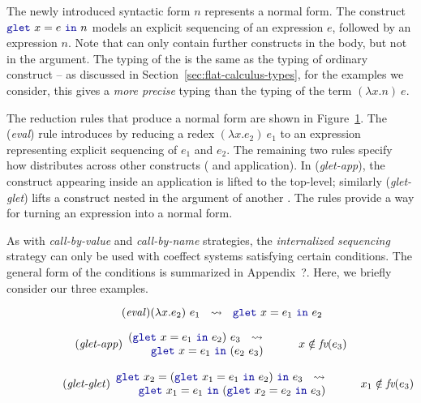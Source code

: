 The newly introduced syntactic form $n$ represents a normal form. The construct $\kvd{glet}~x=e~\kvd{in}~n$
models an explicit sequencing of an expression $e$, followed by an expression $n$. Note that  can 
only contain further  constructs in the body, but not in the argument. The typing of the 
is the same as the typing of ordinary  construct -- as discussed in Section~\ref{sec:flat-calculus-types},
for the examples we consider, this gives a \emph{more precise} typing than the typing of the
term $(\lambda x.n)~e$.

The reduction rules that produce a normal form are shown in Figure~\ref{fig:flat-normal-form}. The
(\emph{eval}) rule introduces  by reducing a redex $(\lambda x.e_2)~e_1$ to an expression
representing explicit sequencing of $e_1$ and $e_2$. The remaining two rules specify how 
distributes across other constructs ( and application). In (\emph{glet-app}), the 
construct appearing inside an application is lifted to the top-level; similarly (\emph{glet-glet}) 
lifts a  construct nested in the argument of another . The rules provide a way
for turning an expression into a normal form.

As with \emph{call-by-value} and \emph{call-by-name} strategies, the \emph{internalized sequencing}
strategy can only be used with coeffect systems satisfying certain conditions. The general form of
the conditions is summarized in Appendix~?. Here, we briefly consider our three examples.


\begin{figure}[t]

\begin{equation*}
\tag{\emph{eval}}
(\lambda x.e_2)~e_1 ~~\leadsto~~ \kvd{glet}~x=e_1~\kvd{in}~e_2
\end{equation*}

\begin{equation*}
\tag{\emph{glet-app}}
\begin{array}{l}
  (\kvd{glet}~x=e_1~\kvd{in}~e_2)~e_3  ~~\leadsto~~\\ \qquad \kvd{glet}~x=e_1~\kvd{in}~(e_2~e_3)
\end{array}
\qquad x \notin \textit{fv}(e_3)\qquad
\end{equation*}

\begin{equation*}
\tag{\emph{glet-glet}}
\begin{array}{l}
  \kvd{glet}~x_2=(\kvd{glet}~x_1 = e_1~\kvd{in}~e_2)~\kvd{in}~e_3  ~~\leadsto~~\\
  \qquad \kvd{glet}~x_1=e_1~\kvd{in}~(\kvd{glet}~x_2=e_2~\kvd{in}~e_3)
\end{array}
\qquad x_1 \notin \textit{fv}(e_3)\qquad
\end{equation*}

\label{fig:flat-normal-form}
\end{figure}


